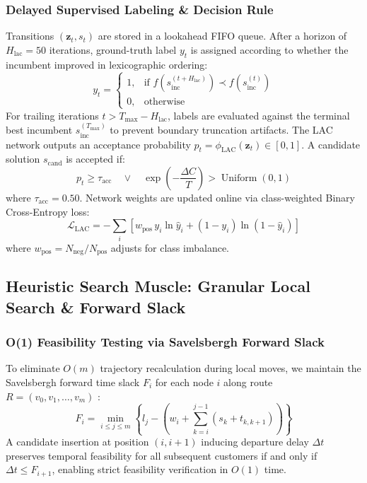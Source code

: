 \subsubsection{Delayed Supervised Labeling \& Decision Rule}
Transitions $(\mathbf{z}_t, s_t)$ are stored in a lookahead FIFO queue. After a horizon of $H_{\text{lac}} = 50$ iterations, ground-truth label $y_t$ is assigned according to whether the incumbent improved in lexicographic ordering:
\begin{equation}
  y_t = \begin{cases} 1, & \text{if } f(s_{\text{inc}}^{(t + H_{\text{lac}})}) \prec f(s_{\text{inc}}^{(t)}) \\ 0, & \text{otherwise} \end{cases}
  \label{eq:lac_label}
\end{equation}
For trailing iterations $t > T_{\max} - H_{\text{lac}}$, labels are evaluated against the terminal best incumbent $s_{\text{inc}}^{(T_{\max})}$ to prevent boundary truncation artifacts.
The LAC network outputs an acceptance probability $p_t = \phi_{\text{LAC}}(\mathbf{z}_t) \in [0, 1]$. A candidate solution $s_{\text{cand}}$ is accepted if:
\begin{equation}
  p_t \ge \tau_{\text{acc}} \quad \lor \quad \exp\left(-\frac{\Delta C}{T}\right) > \operatorname{Uniform}(0, 1)
  \label{eq:lac_decision_rule}
\end{equation}
where $\tau_{\text{acc}} = 0.50$. Network weights are updated online via class-weighted Binary Cross-Entropy loss:
\begin{equation}
  \mathcal{L}_{\text{LAC}} = -\sum_{i} \left[ w_{\text{pos}}\,y_i \ln \hat{y}_i + (1 - y_i) \ln(1 - \hat{y}_i) \right]
  \label{eq:lac_loss}
\end{equation}
where $w_{\text{pos}} = N_{\text{neg}} / N_{\text{pos}}$ adjusts for class imbalance.

\subsection{Heuristic Search Muscle: Granular Local Search \& Forward Slack}
\label{sec:search_muscle}

\subsubsection{O(1) Feasibility Testing via Savelsbergh Forward Slack}
To eliminate $O(m)$ trajectory recalculation during local moves, we maintain the Savelsbergh forward time slack $F_i$ for each node $i$ along route $R = (v_0, v_1, \dots, v_m)$ \cite{savelsbergh1992general}:
\begin{equation}
  F_i = \min_{i \le j \le m} \left\{ l_j - \left( w_i + \sum_{k=i}^{j-1} (s_k + t_{k, k+1}) \right) \right\}
  \label{eq:forward_slack}
\end{equation}
A candidate insertion at position $(i, i+1)$ inducing departure delay $\Delta t$ preserves temporal feasibility for all subsequent customers if and only if $\Delta t \le F_{i+1}$, enabling strict feasibility verification in $O(1)$ time.


